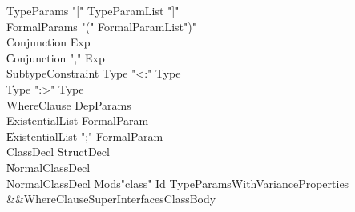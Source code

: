 \begin{grammar}
 TypeParams  \:   \xcd"["  TypeParamList  \xcd"]"\\
 FormalParams  \:   \xcd"("  FormalParamList\opt  \xcd")"\\
 Conjunction  \:   Exp\\
    \|   Conjunction  \xcd","  Exp\\
 SubtypeConstraint  \:   Type    \xcd"<:"  Type  \\
    \|   Type    \xcd":>"  Type  \\
 WhereClause  \:   DepParams\\
 ExistentialList  \:   FormalParam\\
    \|   ExistentialList  \xcd";"  FormalParam\\
 ClassDecl  \:   StructDecl\\
    \|   NormalClassDecl\\
 NormalClassDecl  \:   Mods\opt  \xcd"class"  Id  TypeParamsWithVariance\opt  Properties\opt\\
          &&WhereClause\opt  Super\opt  Interfaces\opt  ClassBody\\
\end{grammar}

